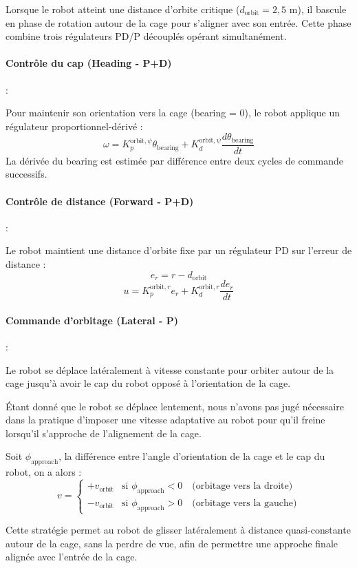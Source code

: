Lorsque le robot atteint une distance d'orbite critique ($d_{\text{orbit}} = 2{,}5$ m), il bascule en phase de rotation autour de la cage pour s'aligner avec son entrée. Cette phase combine trois régulateurs PD/P découplés opérant simultanément.

\paragraph{Contrôle du cap (Heading - P+D)}: 

Pour maintenir son orientation vers la cage (bearing = 0), le robot applique un régulateur proportionnel-dérivé :
\[
\omega = K_p^{\text{orbit},\psi} \theta_{\text{bearing}} + K_d^{\text{orbit},\psi} \frac{d\theta_{\text{bearing}}}{dt}
\]
La dérivée du bearing est estimée par différence entre deux cycles de commande successifs.

\paragraph{Contrôle de distance (Forward - P+D)}: 

Le robot maintient une distance d'orbite fixe par un régulateur PD sur l'erreur de distance :
\[
e_r = r - d_{\text{orbit}}
\]
\[
u = K_p^{\text{orbit},r} e_r + K_d^{\text{orbit},r} \frac{de_r}{dt}
\]

\paragraph{Commande d'orbitage (Lateral - P)}: 

Le robot se déplace latéralement à vitesse constante pour orbiter autour de la cage jusqu'à avoir le cap du robot opposé à l'orientation de la cage. 

Étant donné que le robot se déplace lentement, nous n'avons pas jugé nécessaire dans la pratique d'imposer une vitesse adaptative au robot pour qu'il freine lorsqu'il s'approche de l'alignement de la cage.

Soit $\phi_{\text{approach}}$, la différence entre l'angle d'orientation de la cage et le cap du robot, on a alors :
\[
v = \begin{cases}
+v_{\text{orbit}} & \text{si } \phi_{\text{approach}} < 0 \quad \text{(orbitage vers la droite)} \\
-v_{\text{orbit}} & \text{si } \phi_{\text{approach}} > 0 \quad \text{(orbitage vers la gauche)}
\end{cases}
\]

Cette stratégie permet au robot de glisser latéralement à distance quasi-constante autour de la cage, sans la perdre de vue, afin de permettre une approche finale alignée avec l'entrée de la cage.

